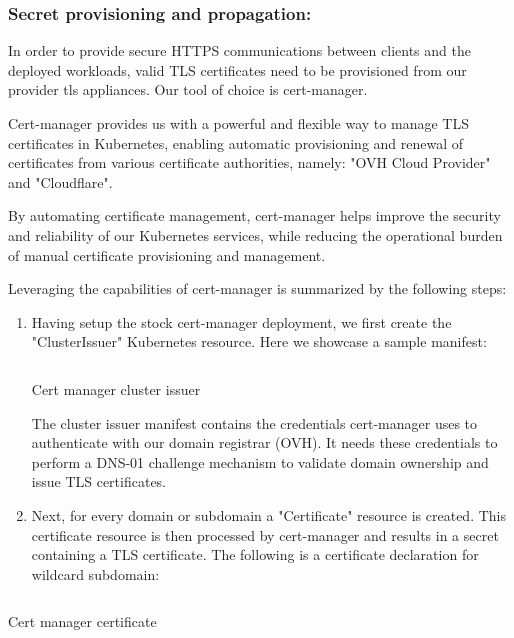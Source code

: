 \subsubsection{Secret provisioning and propagation:}


In order to provide secure HTTPS communications between clients and the deployed workloads, valid TLS certificates need to be provisioned from our provider tls appliances. Our tool of choice is cert-manager.

Cert-manager provides us with a powerful and flexible way to manage TLS certificates in Kubernetes, enabling automatic provisioning and renewal of certificates from various certificate authorities, namely: "OVH Cloud Provider" and "Cloudflare".

By automating certificate management, cert-manager helps improve the security and reliability of our Kubernetes services, while reducing the operational burden of manual certificate provisioning and management.

Leveraging the capabilities of cert-manager is summarized by the following steps:

\begin{enumerate}
    \item  Having setup the stock cert-manager deployment, we first create the "ClusterIssuer" Kubernetes resource. Here we showcase a sample manifest:
        \begin{listing}[H]
        \inputminted{Yaml}{codeListing/cert_manager_cluster_issuer.yml}
        \caption{Cert manager cluster issuer}
        \label{lst:the-code}
        \end{listing}
    The cluster issuer manifest contains the credentials cert-manager uses to authenticate with our domain registrar (OVH). It needs these credentials to perform a DNS-01 challenge mechanism to validate domain ownership and issue TLS certificates.
    \item Next, for every domain or subdomain a "Certificate" resource is created. This certificate resource is then processed by cert-manager and results in a secret containing a TLS certificate. The following is a certificate declaration for wildcard subdomain:

\end{enumerate}
\begin{listing}[H]
\inputminted{Yaml}{codeListing/cert_manager_certificate.yml}
\caption{Cert manager certificate }
\label{lst:certificate}
\end{listing}

